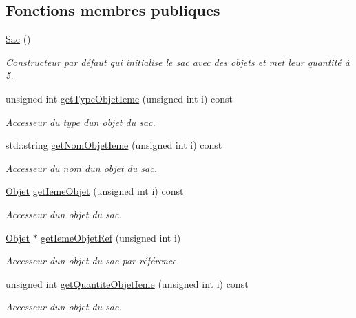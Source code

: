 \subsection*{Fonctions membres publiques}
\begin{DoxyCompactItemize}
\item 
\mbox{\label{class_sac_a0cf1af6ea1eb5a6f64f8b37a3f2d5a4b}} 
\hyperlink{class_sac_a0cf1af6ea1eb5a6f64f8b37a3f2d5a4b}{Sac} ()
\begin{DoxyCompactList}\small\item\em Constructeur par défaut qui initialise le sac avec des objets et met leur quantité à 5. \end{DoxyCompactList}\item 
unsigned int \hyperlink{class_sac_a051e0f7f295c899a0af5cfb8f82b0483}{get\+Type\+Objet\+Ieme} (unsigned int i) const
\begin{DoxyCompactList}\small\item\em Accesseur du type d\textquotesingle{}un objet du sac. \end{DoxyCompactList}\item 
std\+::string \hyperlink{class_sac_ad8d86e7c53ae92e33c8eb89ca5033b55}{get\+Nom\+Objet\+Ieme} (unsigned int i) const
\begin{DoxyCompactList}\small\item\em Accesseur du nom d\textquotesingle{}un objet du sac. \end{DoxyCompactList}\item 
\hyperlink{class_objet}{Objet} \hyperlink{class_sac_af8d00752356d84df7e235c8aeded571b}{get\+Ieme\+Objet} (unsigned int i) const
\begin{DoxyCompactList}\small\item\em Accesseur d\textquotesingle{}un objet du sac. \end{DoxyCompactList}\item 
\hyperlink{class_objet}{Objet} $\ast$ \hyperlink{class_sac_a41f03b324ccd719767a473fca7d2e8ec}{get\+Ieme\+Objet\+Ref} (unsigned int i)
\begin{DoxyCompactList}\small\item\em Accesseur d\textquotesingle{}un objet du sac par référence. \end{DoxyCompactList}\item 
unsigned int \hyperlink{class_sac_a09dbee93f5c31ed563d87171de923d8c}{get\+Quantite\+Objet\+Ieme} (unsigned int i) const
\begin{DoxyCompactList}\small\item\em Accesseur d\textquotesingle{}un objet du sac. \end{DoxyCompactList}\item 

\end{DoxyCompactItemize}
